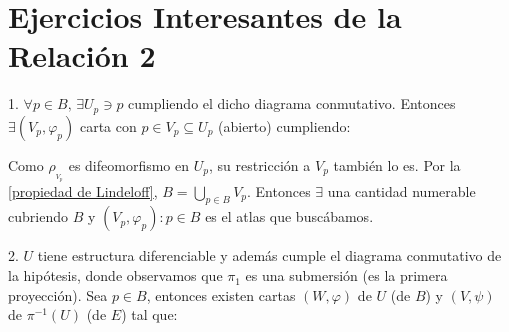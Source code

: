 \documentclass[../VD.tex]{subfiles}
\begin{document}
\section{Ejercicios Interesantes de la Relación 2}

\begin{Exercise}[number=16]
  
\end{Exercise}

\begin{Answer}[number=16]
  1. \(\forall p\in B,\, \exists U_{p}\ni p\) cumpliendo el dicho diagrama
  conmutativo. Entonces \(\exists(V_{p},\varphi_{p})\) carta con \(p\in
  V_{p}\subseteq U_{p}\) (abierto) cumpliendo:

  
  Como \(\rho_{_{V_{p}}}\) es difeomorfismo en \(U_{p}\), su restricción a
  \(V_{p}\) también lo es. Por la \cref{propiedad de Lindeloff},
  \(B=\bigcup_{p\in B}V_{p}\). Entonces \(\exists\) una cantidad numerable
  cubriendo \(B\) y \({(V_{p},\varphi_{p})\colon p\in B}\) es el atlas que buscábamos.

  2. \(U\) tiene estructura diferenciable y además cumple el diagrama
  conmutativo de la hipótesis, donde observamos que \(\pi_{1}\) es una submersión (es
  la primera proyección). Sea \(p\in B\), entonces existen cartas
  \((W,\varphi)\) de \(U\) (de \(B\)) y \((V,\psi)\) de \(\pi^{-1}(U)\) (de
  \(E\)) tal que:

  

\end{Answer}
\end{document}
